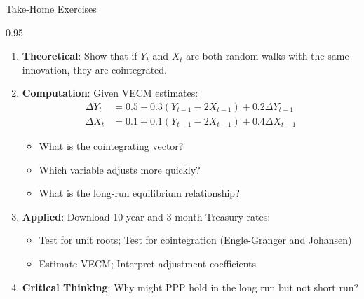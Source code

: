 \documentclass[9pt, aspectratio=169, t]{beamer}
\begin{document}
\begin{frame}{Take-Home Exercises}
    \begin{cminipage}{0.95\textwidth}
    {\footnotesize
    \begin{enumerate}\setlength{\itemsep}{2pt}
        \item \textbf{Theoretical}: Show that if $Y_t$ and $X_t$ are both random walks with the same innovation, they are cointegrated.

        \item \textbf{Computation}: Given VECM estimates:
            \begin{align*}
                \Delta Y_t &= 0.5 - 0.3(Y_{t-1} - 2X_{t-1}) + 0.2\Delta Y_{t-1} \\
                \Delta X_t &= 0.1 + 0.1(Y_{t-1} - 2X_{t-1}) + 0.4\Delta X_{t-1}
            \end{align*}
            \begin{itemize}\setlength{\itemsep}{0pt}
                \item What is the cointegrating vector?
                \item Which variable adjusts more quickly?
                \item What is the long-run equilibrium relationship?
            \end{itemize}

        \item \textbf{Applied}: Download 10-year and 3-month Treasury rates:
            \begin{itemize}\setlength{\itemsep}{0pt}
                \item Test for unit roots; Test for cointegration (Engle-Granger and Johansen)
                \item Estimate VECM; Interpret adjustment coefficients
            \end{itemize}

        \item \textbf{Critical Thinking}: Why might PPP hold in the long run but not short run?
    \end{enumerate}
    }
    \end{cminipage}
\end{frame}
\end{document}
